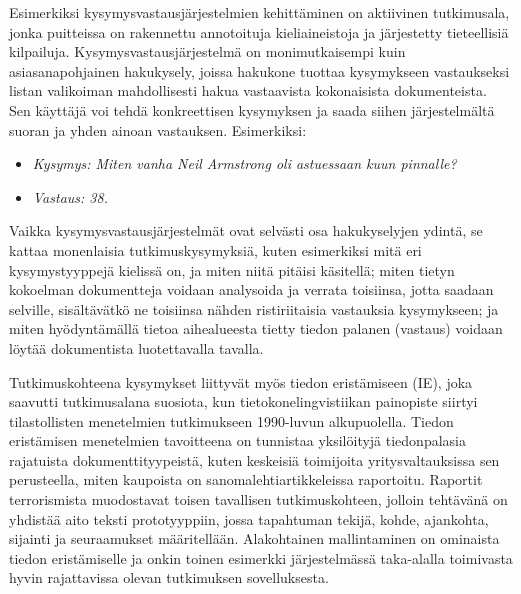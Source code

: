 \begin{multicols}{2}

Esimerkiksi kysymysvastausjärjestelmien kehittäminen on aktiivinen tutkimusala, jonka puitteissa on rakennettu annotoituja kieliaineistoja ja järjestetty tieteellisiä kilpailuja. Kysymysvastausjärjestelmä on monimutkaisempi kuin asiasanapohjainen hakukysely, joissa hakukone tuottaa kysymykseen vastaukseksi listan valikoiman mahdollisesti hakua vastaavista kokonaisista dokumenteista. Sen käyttäjä voi tehdä konkreettisen kysymyksen ja saada siihen järjestelmältä suoran ja yhden ainoan vastauksen. Esimerkiksi:

\begin{itemize}
\item[] \textit{Kysymys: Miten vanha Neil Armstrong oli astuessaan
 kuun pinnalle?}

\item[] \textit{Vastaus: 38.}
\end{itemize}

Vaikka kysymysvastausjärjestelmät ovat selvästi osa hakukyselyjen ydintä, se kattaa monenlaisia tutkimuskysymyksiä, kuten esimerkiksi mitä eri kysymystyyppejä kielissä on, ja miten niitä pitäisi käsitellä; miten tietyn kokoelman dokumentteja voidaan analysoida ja verrata toisiinsa, jotta saadaan selville, sisältävätkö ne toisiinsa nähden ristiriitaisia vastauksia kysymykseen; ja miten hyödyntämällä tietoa aihealueesta tietty tiedon palanen (vastaus) voidaan löytää dokumentista luotettavalla tavalla.

Tutkimuskohteena kysymykset liittyvät myös tiedon eristämiseen (IE), joka saavutti tutkimusalana suosiota, kun tietokonelingvistiikan painopiste siirtyi tilastollisten menetelmien tutkimukseen 1990-luvun alkupuolella. Tiedon eristämisen menetelmien tavoitteena on tunnistaa yksilöityjä tiedonpalasia rajatuista dokumenttityypeistä, kuten keskeisiä toimijoita yritysvaltauksissa sen perusteella, miten kaupoista on sanomalehtiartikkeleissa raportoitu.  Raportit terrorismista muodostavat toisen tavallisen tutkimuskohteen, jolloin tehtävänä on yhdistää aito teksti prototyyppiin, jossa tapahtuman tekijä, kohde, ajankohta, sijainti ja seuraamukset määritellään. Alakohtainen mallintaminen on ominaista tiedon eristämiselle ja onkin toinen esimerkki järjestelmässä taka-alalla toimivasta hyvin rajattavissa olevan tutkimuksen sovelluksesta.


\end{multicols}
